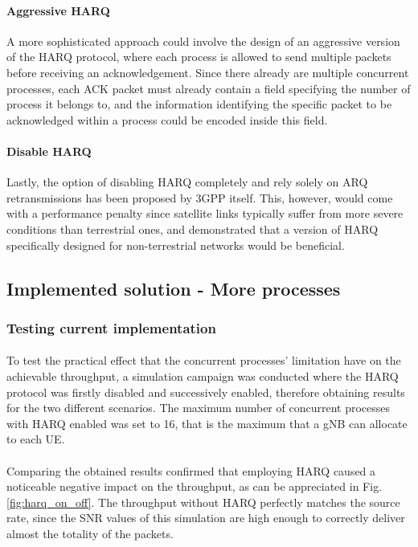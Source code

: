 \paragraph{Aggressive HARQ}
A more sophisticated approach could involve the design of an aggressive version of the \ac{HARQ} protocol, where each process is allowed to send multiple packets before receiving an acknowledgement. Since there already are multiple concurrent processes, each \ac{ACK} packet must already contain a field specifying the number of process it belongs to, and the information identifying the specific packet to be acknowledged within a process could be encoded inside this field.
\paragraph{Disable \ac{HARQ}}
Lastly, the option of disabling \ac{HARQ} completely and rely solely on \ac{ARQ} retransmissions has been proposed by 3GPP itself\cite{hybrid-arq-schemes-muk}. This, however, would come with a performance penalty since satellite links typically suffer from more severe conditions than terrestrial ones, and \cite{5g-beyond-5g-ntn-trends-vanellicoralli} demonstrated that a version of \ac{HARQ} specifically designed for non-terrestrial networks would be beneficial.

\subsection{Implemented solution - More processes}
\subsubsection{Testing current implementation}
\paragraph{}
To test the practical effect that the concurrent processes' limitation have on the achievable throughput, a simulation campaign was conducted where the \ac{HARQ} protocol was firstly disabled and successively enabled, therefore obtaining results for the two different scenarios. The maximum number of concurrent processes with \ac{HARQ} enabled was set to 16, that is the maximum that a \ac{gNB} can allocate to each \ac{UE}.

\paragraph{}
Comparing the obtained results confirmed that employing \ac{HARQ} caused a noticeable negative impact on the throughput, as can be appreciated in Fig. \ref{fig:harq_on_off}. The throughput without \ac{HARQ} perfectly matches the source rate, since the \ac{SNR} values of this simulation are high enough to correctly deliver almost the totality of the packets. 

